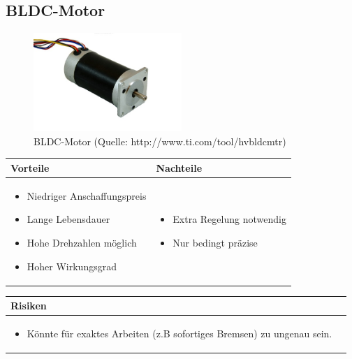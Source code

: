 \pagebreak

\subsection{BLDC-Motor}

\begin{figure}[h!]%
\centering
\includegraphics[width=0.5\textwidth]{fig/blcd.jpg}
\caption{BLDC-Motor (Quelle: http://www.ti.com/tool/hvbldcmtr)}
\label{fig:Java}
\end{figure}

\begin{table}[h]
\begin{tabular}{p{} | p{}}


 \textbf{Vorteile} & \textbf{Nachteile} \\ \hline
	 
\begin{itemize}
\item Niedriger Anschaffungspreis
\item Lange Lebensdauer
\item Hohe Drehzahlen möglich
\item Hoher Wirkungsgrad
\end{itemize}

 
 &
 
\begin{itemize}
\item Extra Regelung notwendig
\item Nur bedingt präzise
\end{itemize}

\end{tabular}
\end{table}

\begin{table}[h]
\begin{tabular}{p{}p{}}


 \textbf{Risiken} & \\ \hline
	 
\begin{itemize}
\item Könnte für exaktes Arbeiten (z.B sofortiges Bremsen) zu ungenau sein.
\end{itemize}

 
\end{tabular}
\end{table}

\pagebreak